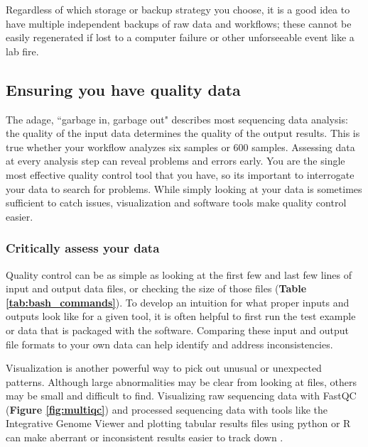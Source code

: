 \documentclass[10pt,letterpaper]{article}
\begin{document}
Regardless of which storage or backup strategy you choose, it is a good idea to have multiple independent backups of raw data and workflows; these cannot be easily regenerated if lost to a computer failure or other unforseeable event like a lab fire. 

\subsection*{Ensuring you have quality data} %

The adage, ``garbage in, garbage out" describes most sequencing data analysis: the quality of the input data determines the quality of the output results. 
This is true whether your workflow analyzes six samples or 600 samples.
Assessing data at every analysis step can reveal problems and errors early. 
You are the single most effective quality control tool that you have, so its important to interrogate your data to search for problems. 
While simply looking at your data is sometimes sufficient to catch issues, visualization and software tools make quality control easier. 



\subsubsection*{Critically assess your data}
Quality control can be as simple as looking at the first few and last few lines of input and output data files, or checking the size of those files (\textbf{Table \ref{tab:bash_commands}}). 
To develop an intuition for what proper inputs and outputs look like for a given tool, it is often helpful to first run the test example or data that is packaged with the software. 
Comparing these input and output file formats to your own data can help identify and address inconsistencies. 

Visualization is another powerful way to pick out unusual or unexpected patterns. 
Although large abnormalities may be clear from looking at files, others may be small and difficult to find. 
Visualizing raw sequencing data with FastQC (\textbf{Figure \ref{fig:multiqc}}) and processed sequencing data with tools like the Integrative Genome Viewer and plotting tabular results files using python or R can make aberrant or inconsistent results easier to track down \cite{andrews2010fastqc, thorvaldsdottir2013integrative}.
\end{document}

